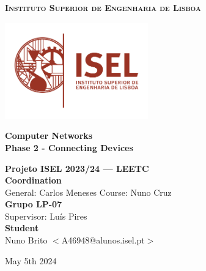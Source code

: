 \documentclass[11pt,a4paper]{report}
\newcommand{\school}{Instituto Superior de Engenharia de Lisboa}
\newcommand{\projisel}{Projeto ISEL 2023/24 --- LEETC}
\newcommand{\projtitle}{Computer Networks}
\newcommand{\projsubtitle}{Phase 2 - Connecting Devices}
\newcommand{\projteam}{Grupo LP-07}
\begin{document}
    \setcounter{page}{1}

\begin{titlepage}
    \center

    \vspace*{-12mm}
    {\large \textbf{\textsc{\school}}}\\

    \vfill

    \includegraphics[width=62mm]{logoisel}
    
    \vfill
    
    {\huge \textbf{\projtitle}}\\[6mm]
    {\Large \textbf{\projsubtitle}}\\
    
    \vfill
    
    \vfill
    
    {\Large \textbf{\projisel}}\\[12mm]
    
    {\Large \textbf{Coordination}}\\[4mm]
    {\large General: Carlos Meneses\hspace*{18mm}
            Course: Nuno Cruz}\\[6mm]
    
    {\Large \textbf{\projteam}}\\[4mm]
    {\large Supervisor: Luís Pires\hspace*{12mm}}\\[6mm]
    
    {\Large \textbf{Student}}\\[4mm]
    {\large Nuno Brito $<$A46948@alunos.isel.pt$>$}
    
    \vspace*{10mm}
    
    \renewcommand{\today}{May 5th 2024}
    \today
    
\end{titlepage}

\tableofcontents
\end{document}
